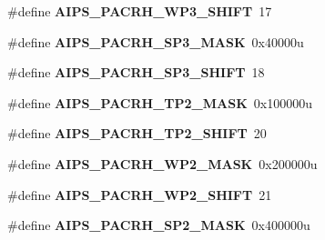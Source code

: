 \begin{DoxyCompactItemize}
\item 
\#define {\bfseries A\+I\+P\+S\+\_\+\+P\+A\+C\+R\+H\+\_\+\+W\+P3\+\_\+\+S\+H\+I\+FT}~17\hypertarget{group__AIPS__Register__Masks_gac82d47d244461257d65eee9eac87806a}{}\label{group__AIPS__Register__Masks_gac82d47d244461257d65eee9eac87806a}

\item 
\#define {\bfseries A\+I\+P\+S\+\_\+\+P\+A\+C\+R\+H\+\_\+\+S\+P3\+\_\+\+M\+A\+SK}~0x40000u\hypertarget{group__AIPS__Register__Masks_gad1010fcc65db60bb29654390130e8a67}{}\label{group__AIPS__Register__Masks_gad1010fcc65db60bb29654390130e8a67}

\item 
\#define {\bfseries A\+I\+P\+S\+\_\+\+P\+A\+C\+R\+H\+\_\+\+S\+P3\+\_\+\+S\+H\+I\+FT}~18\hypertarget{group__AIPS__Register__Masks_ga1b9c4b160ca3b0d2dac62596f069b86c}{}\label{group__AIPS__Register__Masks_ga1b9c4b160ca3b0d2dac62596f069b86c}

\item 
\#define {\bfseries A\+I\+P\+S\+\_\+\+P\+A\+C\+R\+H\+\_\+\+T\+P2\+\_\+\+M\+A\+SK}~0x100000u\hypertarget{group__AIPS__Register__Masks_ga5db2a0cc647700e09917f238f362f557}{}\label{group__AIPS__Register__Masks_ga5db2a0cc647700e09917f238f362f557}

\item 
\#define {\bfseries A\+I\+P\+S\+\_\+\+P\+A\+C\+R\+H\+\_\+\+T\+P2\+\_\+\+S\+H\+I\+FT}~20\hypertarget{group__AIPS__Register__Masks_ga192e269418928d5af81015c80880ea8a}{}\label{group__AIPS__Register__Masks_ga192e269418928d5af81015c80880ea8a}

\item 
\#define {\bfseries A\+I\+P\+S\+\_\+\+P\+A\+C\+R\+H\+\_\+\+W\+P2\+\_\+\+M\+A\+SK}~0x200000u\hypertarget{group__AIPS__Register__Masks_ga93d1ce3ca810abb1372e26a0a773f111}{}\label{group__AIPS__Register__Masks_ga93d1ce3ca810abb1372e26a0a773f111}

\item 
\#define {\bfseries A\+I\+P\+S\+\_\+\+P\+A\+C\+R\+H\+\_\+\+W\+P2\+\_\+\+S\+H\+I\+FT}~21\hypertarget{group__AIPS__Register__Masks_ga6e39769cd6d49e3fbd0363bcdabfcf8a}{}\label{group__AIPS__Register__Masks_ga6e39769cd6d49e3fbd0363bcdabfcf8a}

\item 
\#define {\bfseries A\+I\+P\+S\+\_\+\+P\+A\+C\+R\+H\+\_\+\+S\+P2\+\_\+\+M\+A\+SK}~0x400000u\hypertarget{group__AIPS__Register__Masks_ga6ca1bcae348acd71536e31efc8373a5c}{}\label{group__AIPS__Register__Masks_ga6ca1bcae348acd71536e31efc8373a5c}


\end{DoxyCompactItemize}
